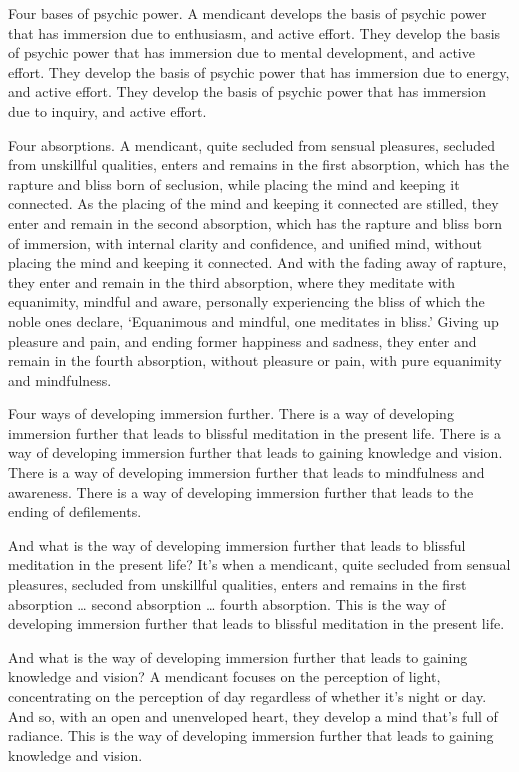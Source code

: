 \documentclass[12pt,openany]{book}%
\begin{document}
Four bases of psychic power. A mendicant develops the basis of psychic power that has immersion due to enthusiasm, and active effort. They develop the basis of psychic power that has immersion due to mental development, and active effort. They develop the basis of psychic power that has immersion due to energy, and active effort. They develop the basis of psychic power that has immersion due to inquiry, and active effort. 

Four absorptions. A mendicant, quite secluded from sensual pleasures, secluded from unskillful qualities, enters and remains in the first absorption, which has the rapture and bliss born of seclusion, while placing the mind and keeping it connected. As the placing of the mind and keeping it connected are stilled, they enter and remain in the second absorption, which has the rapture and bliss born of immersion, with internal clarity and confidence, and unified mind, without placing the mind and keeping it connected. And with the fading away of rapture, they enter and remain in the third absorption, where they meditate with equanimity, mindful and aware, personally experiencing the bliss of which the noble ones declare, ‘Equanimous and mindful, one meditates in bliss.’ Giving up pleasure and pain, and ending former happiness and sadness, they enter and remain in the fourth absorption, without pleasure or pain, with pure equanimity and mindfulness. 

Four ways of developing immersion further. There is a way of developing immersion further that leads to blissful meditation in the present life. There is a way of developing immersion further that leads to gaining knowledge and vision. There is a way of developing immersion further that leads to mindfulness and awareness. There is a way of developing immersion further that leads to the ending of defilements. 

And what is the way of developing immersion further that leads to blissful meditation in the present life? It’s when a mendicant, quite secluded from sensual pleasures, secluded from unskillful qualities, enters and remains in the first absorption … second absorption … fourth absorption. This is the way of developing immersion further that leads to blissful meditation in the present life. 

And what is the way of developing immersion further that leads to gaining knowledge and vision? A mendicant focuses on the perception of light, concentrating on the perception of day regardless of whether it’s night or day. And so, with an open and unenveloped heart, they develop a mind that’s full of radiance. This is the way of developing immersion further that leads to gaining knowledge and vision. 
\end{document}
